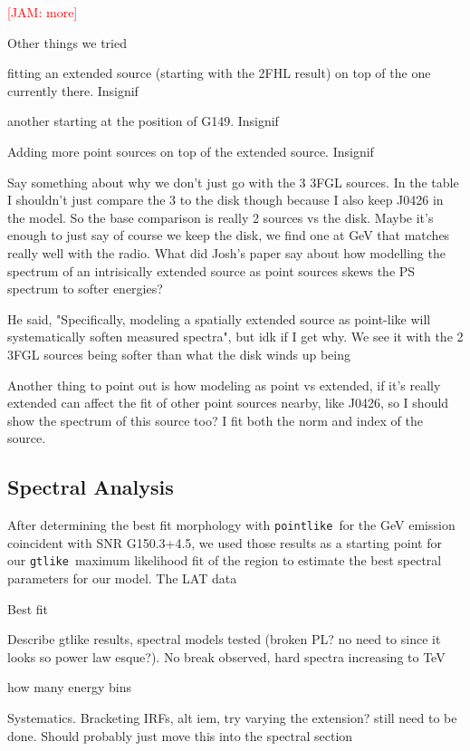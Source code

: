 \documentclass[preprint2]{aastex}
\newcommand{\kibitz}[2]{\ifnum\Comments=1\textcolor{#1}{#2}\fi}
\newcommand{\jamie}[1]{\kibitz{red}      {[JAM: #1]}}
\newcommand{\ptlike}{{\tt pointlike}}
\newcommand{\gtlike}{{\tt gtlike}}
\newcommand{\Gone}{G150.3+4.5}
\begin{document}
\jamie{more}

Other things we tried

fitting an extended source (starting with the 2FHL result) on top of the one currently there. Insignif

another starting at the position of G149. Insignif

Adding more point sources on top of the extended source. Insignif

Say something about why we don't just go with the 3 3FGL sources. In the table I shouldn't just compare the 3 to the disk though because I also keep J0426 in the model. So the base comparison is really 2 sources vs the disk. Maybe it's enough to just say of course we keep the disk, we find one at GeV that matches really well with the radio. What did Josh's paper say about how modelling the spectrum of an intrisically extended source as point sources skews the PS spectrum to softer energies?

He said, "Specifically, modeling a spatially extended source as point-like will systematically soften measured spectra", but idk if I get why. We see it with the 2 3FGL sources being softer than what the disk winds up being

Another thing to point out is how modeling as point vs extended, if it's really extended can affect the fit of other point sources nearby, like J0426, so I should show the spectrum of this source too?  I fit both the norm and index of the source. 



\subsection{\label{sec:LATspec}Spectral Analysis}
After determining the best fit morphology with \ptlike~for the GeV emission coincident with SNR \Gone, we used those results as a starting point for our \gtlike~maximum likelihood fit of the region to estimate the best spectral parameters for our model. The LAT data 

Best fit 

Describe gtlike  results, spectral models tested (broken PL? no need to since it looks so power law esque?). No break observed, hard spectra increasing to TeV

how many energy bins

Systematics. Bracketing IRFs, alt iem, try varying the extension? still need to be done. Should probably just move this into the spectral  section


%
%
\end{document}
